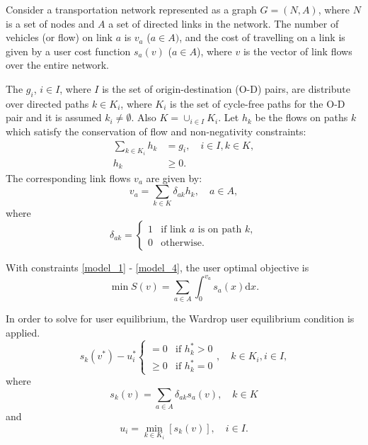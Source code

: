 
Consider a transportation network represented as a graph $G = (N, A)$,
where $N$ is a set of nodes and $A$ a set of directed links in the network.
The number of vehicles (or flow) on link $a$ is $v_a$ ($a \in A)$,
and the cost of travelling on a link is given by a user cost function $s_a(v)$ ($a \in A$),
where $v$ is the vector of link flows over the entire network.

The $g_i$,
$i \in I$, where $I$ is the set of origin-destination (O-D) pairs,
are distribute over directed paths $k \in K_i$,
where $K_i$ is the set of cycle-free paths for the O-D pair and it is assumed $k_i \neq \emptyset$. Also $K = \cup_{i \in I} K_i$.
Let $h_k$ be the flows on paths $k$ which satisfy the conservation of flow and non-negativity constraints:
\begin{align} \label{model_1}
    \sum_{k \in K_i} h_k & = g_i, \quad i \in I, k \in K, \\
    h_k &\geq 0.
\end{align}
The corresponding link flows $v_a$ are given by:
\begin{equation}
    v_a = \sum_{k \in K} \delta_{ak} h_k, \quad a \in A,
\end{equation}
where
\begin{equation} \label{model_4}
    \delta_{ak} = 
    \begin{cases}
        1 & \text{if link $a$ is on path $k$},\\
        0 & \text{otherwise}.
    \end{cases}
\end{equation}

With constraints \ref{model_1} - \ref{model_4},
the user optimal objective is
\begin{equation}
    \min S(v) = \sum_{a\in A} \int_0^{v_a} s_a(x) \mathrm{d} x.
\end{equation}

In order to solve for user equilibrium,
the Wardrop user equilibrium condition \citep{Wardrop} is applied.\\

\begin{equation}
    s_k(v^{\ast}) - u_i^{\ast} 
    \begin{cases}
        =0 & \text{if } h_k^{\ast} > 0 \\
        \geq 0 & \text{if } h_k^{\ast} = 0
    \end{cases}
    ,
    \quad k \in K_i, i \in I,
\end{equation}
where 
\begin{equation}
    s_k(v) = \sum_{a \in A} \delta_{ak} s_a(v), \quad k \in K
\end{equation}
and
\begin{equation}
    u_i = \min_{k \in K_i} \left[ s_k(v) \right], \quad i \in I.
\end{equation}


